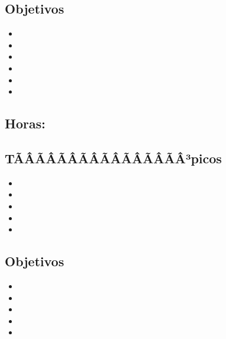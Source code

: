 \subsection*{Objetivos}
\begin{itemize}
	\item \PFUNOObjUNO
	\item \PFUNOObjDOS
	\item \PFUNOObjTRES
	\item \PFUNOObjCUATRO
	\item \PFUNOObjCINCO
	\item \PFUNOObjSEIS
\end{itemize}

\subsection{\PFDOSDef}\label{sec:BOK-PF2}
\subsection*{Horas: \PFDOSHours}

\subsection*{TÃÂÃÂÃÂÃÂÃÂÃÂÃÂÃÂ³picos}
\begin{itemize}
	\item \PFDOSTopicEstrategias
	\item \PFDOSTopicEl
	\item \PFDOSTopicEstrategiasde
	\item \PFDOSTopicEstrategiasdedepuracion
	\item \PFDOSTopicElConcepto
\end{itemize}

\subsection*{Objetivos}
\begin{itemize}
	\item \PFDOSObjUNO
	\item \PFDOSObjDOS
	\item \PFDOSObjTRES
	\item \PFDOSObjCUATRO
	\item \PFDOSObjCINCO
\end{itemize}

\subsection{\PFTRESDef}\label{sec:BOK-PF3}

